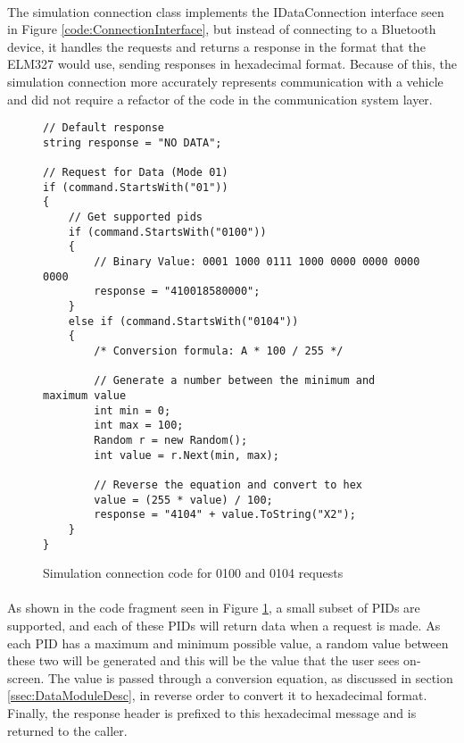{{		\paragraph{}{
		The simulation connection class implements the IDataConnection interface seen in Figure \ref{code:ConnectionInterface}, but instead of connecting to a Bluetooth device, it handles the requests and returns a response in the format that the ELM327 would use, sending responses in hexadecimal format. Because of this, the simulation connection more accurately represents communication with a vehicle and did not require a refactor of the code in the communication system layer.
		}	
		\begin{figure}[h]
			\begin{lstlisting}
// Default response
string response = "NO DATA";

// Request for Data (Mode 01)
if (command.StartsWith("01"))
{
	// Get supported pids
	if (command.StartsWith("0100"))
    {
		// Binary Value: 0001 1000 0111 1000 0000 0000 0000 0000
		response = "410018580000";
	}
    else if (command.StartsWith("0104"))
	{
    	/* Conversion formula: A * 100 / 255 */
    	
    	// Generate a number between the minimum and maximum value
        int min = 0;
		int max = 100;
        Random r = new Random();
		int value = r.Next(min, max);

		// Reverse the equation and convert to hex
        value = (255 * value) / 100;
		response = "4104" + value.ToString("X2");
	}
}
			\end{lstlisting}
			\caption{Simulation connection code for 0100 and 0104 requests}
			\label{code:SimConnectionData}
		\end{figure}

		\paragraph{}{
		As shown in the code fragment seen  in Figure \ref{code:SimConnectionData}, a small subset of PIDs are supported, and each of these PIDs will return data when a request is made. As each PID has a maximum and minimum possible value, a random value between these two will be generated and this will be the value that the user sees on-screen. The value  is passed through a conversion equation, as discussed in section \ref{ssec:DataModuleDesc}, in reverse order to convert it to hexadecimal format. Finally, the response header is prefixed to this hexadecimal message and is returned to the caller.
		}
}}

